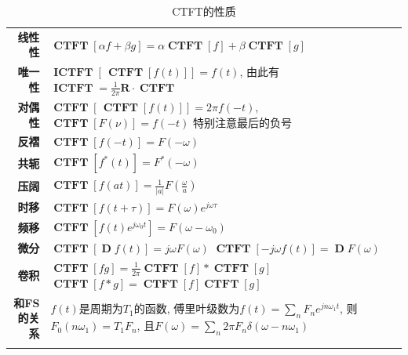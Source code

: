 \documentclass{ctexart}
\DeclareMathOperator{\CTFT}{\mathbf{CTFT}}
\DeclareMathOperator{\ICTFT}{\mathbf{ICTFT}}
\DeclareMathOperator{\D}{\mathbf{D}}
\newlength{\Oldarrayrulewidth}
\newcommand{\Hline}[1]{
  \noalign{\global\setlength{\Oldarrayrulewidth}{\arrayrulewidth}}
  \noalign{\global\setlength{\arrayrulewidth}{#1}}\hline
  \noalign{\global\setlength{\arrayrulewidth}{\Oldarrayrulewidth}}}
\newcommand{\Topline}{\Hline{0.08em}}
\newcommand{\Bottomline}{\Hline{0.08em}}
\begin{document}
    \begin{table}[ht!]
    \begin{tabularx}{\textwidth}{|>{\bfseries}r  L|}
        \Topline
        线性性          & $\displaystyle \CTFT[\alpha f + \beta g] = \alpha \CTFT[f] + \beta \CTFT[g]$\\
        唯一性          & $\displaystyle \ICTFT[ \, \CTFT[f(t)] ] = f(t)$,
                            由此有$\displaystyle \ICTFT = \frac{1}{2\pi} \mathbf{R} \cdot \CTFT$\\
        对偶性          & $\displaystyle \CTFT [ \, \CTFT[ f(t) ] ] = 2 \pi f(-t)$, $\displaystyle \CTFT [ F(\nu) ] = f(-t)$
                            特别注意最后的负号\\
        反褶            & $\displaystyle \CTFT[f(-t)] = F(-\omega)$\\
        共轭            & $\displaystyle \CTFT[f^*(t)] = F^*(-\omega)$\\
        压阔            & $\displaystyle \CTFT[f(at)] = \frac{1}{|a|} F(\frac{\omega}{a})$\\
        时移            & $\displaystyle \CTFT[f(t + \tau)] = F(\omega) e^{j \omega \tau}$\\
        频移            & $\displaystyle \CTFT[f(t) e^{j \omega_0 t}] = F(\omega - \omega_0)$\\
        微分            & $\displaystyle \CTFT[\D f(t)] = j \omega F(\omega)$ \newline
                            $\CTFT[-j \omega f(t)] = \D F(\omega)$\\
        卷积            & $\displaystyle \CTFT[f g] = \frac{1}{2\pi} \CTFT[f] * \CTFT[g]$\newline
                            $\CTFT[f * g] = \CTFT[f] \CTFT[g]$\\
        和FS的关系      & $f(t)$是周期为$T_1$的函数, 傅里叶级数为$f(t) = \sum_n F_n e^{j n \omega_1 t}$,
            则$F_0(n\omega_1) = T_1 F_n$, 且$F(\omega) = \sum_n 2\pi F_n \delta(\omega - n \omega_1)$\\
        \Bottomline
    \end{tabularx}
    \caption{CTFT的性质}
    \end{table}
\end{document}
